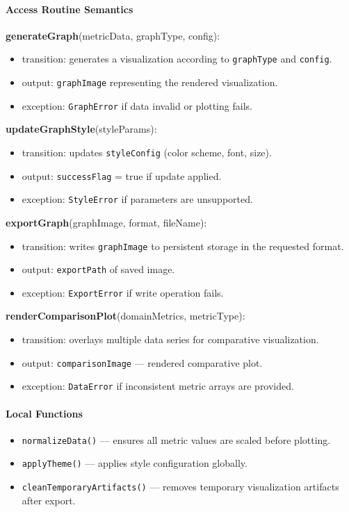 \documentclass[12pt, titlepage]{article}
\begin{document}
\begin{itemize}
  \paragraph{Access Routine Semantics}

  \noindent \textbf{generateGraph}(metricData, graphType, config):
  \begin{itemize}
    \item transition: generates a visualization according to \texttt{graphType} and \texttt{config}.
    \item output: \texttt{graphImage} representing the rendered visualization.
    \item exception: \texttt{GraphError} if data invalid or plotting fails.
  \end{itemize}

  \noindent \textbf{updateGraphStyle}(styleParams):
  \begin{itemize}
    \item transition: updates \texttt{styleConfig} (color scheme, font, size).
    \item output: \texttt{successFlag} = true if update applied.
    \item exception: \texttt{StyleError} if parameters are unsupported.
  \end{itemize}

  \noindent \textbf{exportGraph}(graphImage, format, fileName):
  \begin{itemize}
    \item transition: writes \texttt{graphImage} to persistent storage in the requested format.
    \item output: \texttt{exportPath} of saved image.
    \item exception: \texttt{ExportError} if write operation fails.
  \end{itemize}

  \noindent \textbf{renderComparisonPlot}(domainMetrics, metricType):
  \begin{itemize}
    \item transition: overlays multiple data series for comparative visualization.
    \item output: \texttt{comparisonImage} — rendered comparative plot.
    \item exception: \texttt{DataError} if inconsistent metric arrays are provided.
  \end{itemize}

  \paragraph{Local Functions}
  \begin{itemize}
    \item \texttt{normalizeData()} — ensures all metric values are scaled before plotting.
    \item \texttt{applyTheme()} — applies style configuration globally.
    \item \texttt{cleanTemporaryArtifacts()} — removes temporary visualization artifacts after export.
  \end{itemize}


\end{itemize}
\end{document}

